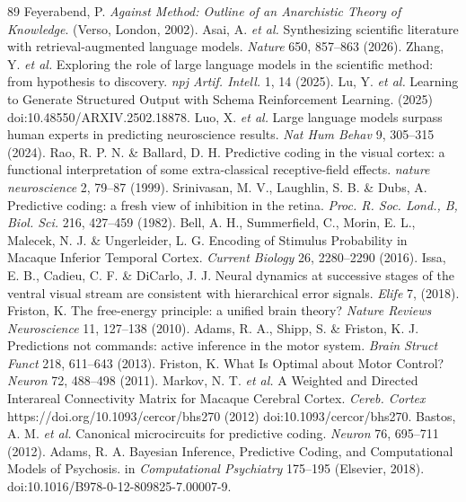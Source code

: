 \documentclass[12pt]{article}
\begin{document}
\begin{thebibliography}{89}
 Feyerabend, P. \emph{Against Method: Outline of an Anarchistic Theory of Knowledge}. (Verso, London, 2002).
 Asai, A. \emph{et al.} Synthesizing scientific literature with retrieval-augmented language models. \emph{Nature} 650, 857--863 (2026).
 Zhang, Y. \emph{et al.} Exploring the role of large language models in the scientific method: from hypothesis to discovery. \emph{npj Artif. Intell.} 1, 14 (2025).
 Lu, Y. \emph{et al.} Learning to Generate Structured Output with Schema Reinforcement Learning. (2025) doi:10.48550/ARXIV.2502.18878.
 Luo, X. \emph{et al.} Large language models surpass human experts in predicting neuroscience results. \emph{Nat Hum Behav} 9, 305--315 (2024).
 Rao, R. P. N. \& Ballard, D. H. Predictive coding in the visual cortex: a functional interpretation of some extra-classical receptive-field effects. \emph{nature neuroscience} 2, 79--87 (1999).
 Srinivasan, M. V., Laughlin, S. B. \& Dubs, A. Predictive coding: a fresh view of inhibition in the retina. \emph{Proc. R. Soc. Lond., B, Biol. Sci.} 216, 427--459 (1982).
 Bell, A. H., Summerfield, C., Morin, E. L., Malecek, N. J. \& Ungerleider, L. G. Encoding of Stimulus Probability in Macaque Inferior Temporal Cortex. \emph{Current Biology} 26, 2280--2290 (2016).
 Issa, E. B., Cadieu, C. F. \& DiCarlo, J. J. Neural dynamics at successive stages of the ventral visual stream are consistent with hierarchical error signals. \emph{Elife} 7, (2018).
 Friston, K. The free-energy principle: a unified brain theory? \emph{Nature Reviews Neuroscience} 11, 127--138 (2010).
 Adams, R. A., Shipp, S. \& Friston, K. J. Predictions not commands: active inference in the motor system. \emph{Brain Struct Funct} 218, 611--643 (2013).
 Friston, K. What Is Optimal about Motor Control? \emph{Neuron} 72, 488--498 (2011).
 Markov, N. T. \emph{et al.} A Weighted and Directed Interareal Connectivity Matrix for Macaque Cerebral Cortex. \emph{Cereb. Cortex} https://doi.org/10.1093/cercor/bhs270 (2012) doi:10.1093/cercor/bhs270.
 Bastos, A. M. \emph{et al.} Canonical microcircuits for predictive coding. \emph{Neuron} 76, 695--711 (2012).
 Adams, R. A. Bayesian Inference, Predictive Coding, and Computational Models of Psychosis. in \emph{Computational Psychiatry} 175--195 (Elsevier, 2018). doi:10.1016/B978-0-12-809825-7.00007-9.

\end{thebibliography}
\end{document}
